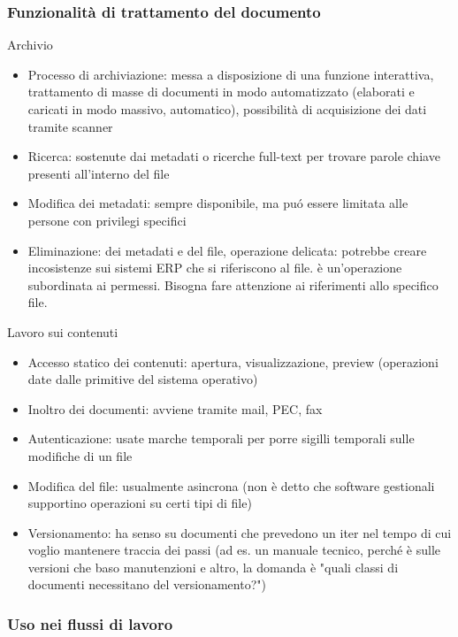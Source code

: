 \subsubsection{Funzionalit\`a di trattamento del
documento}

Archivio

\begin{itemize}

\item
  Processo di archiviazione: messa a disposizione di una funzione
  interattiva, trattamento di masse di documenti in modo automatizzato
  (elaborati e caricati in modo massivo, automatico), possibilit\`a di
  acquisizione dei dati tramite scanner
\item
  Ricerca: sostenute dai metadati o ricerche full-text per trovare
  parole chiave presenti all'interno del file
\item
  Modifica dei metadati: sempre disponibile, ma pu\'o essere limitata alle
  persone con privilegi specifici
\item
  Eliminazione: dei metadati e del file, operazione delicata: potrebbe
  creare incosistenze sui sistemi ERP che si riferiscono al file. \`e
  un'operazione subordinata ai permessi.
  Bisogna fare attenzione ai riferimenti allo specifico file.
\end{itemize}

Lavoro sui contenuti

\begin{itemize}

\item
  Accesso statico dei contenuti: apertura, visualizzazione, preview
  (operazioni date dalle primitive del sistema operativo)
\item
  Inoltro dei documenti: avviene tramite mail, PEC, fax
\item
  Autenticazione: usate marche temporali per porre sigilli temporali
  sulle modifiche di un file
\item
  Modifica del file: usualmente asincrona (non \`e detto che software
  gestionali supportino operazioni su certi tipi di file)
\item
  Versionamento: ha senso su documenti che prevedono un iter nel tempo
  di cui voglio mantenere traccia dei passi (ad es. un manuale tecnico,
  perch\'e \`e sulle versioni che baso manutenzioni e altro, la domanda \`e
  "quali classi di documenti necessitano del versionamento?")
\end{itemize}

\subsubsection{Uso nei flussi di lavoro}

